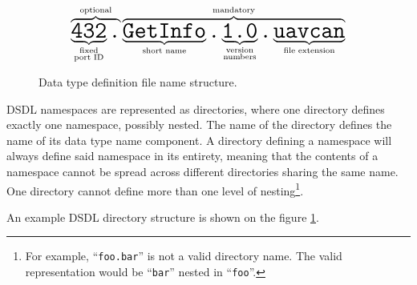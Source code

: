\begin{figure}[H]
    $$
    \overbrace{%
        \underbrace{\texttt{\huge{432}}}_{\substack{\text{fixed} \\ \text{port ID}}}%
        \texttt{\huge{.}}%
    }^{\text{optional}}%
    \overbrace{%
        \underbrace{\texttt{\huge{GetInfo}}}_{\substack{\text{short name}}}%
        \texttt{\huge{.}}%
        \underbrace{\texttt{\huge{1.0}}}_{\substack{\text{version} \\ \text{numbers}}}%
        \texttt{\huge{.}}%
        \underbrace{\texttt{\huge{uavcan}}}_{\text{file extension}}%
    }^{\text{mandatory}}
    $$
    \caption{Data type definition file name structure.\label{fig:dsdl_definition_file_name_structure}}
\end{figure}

DSDL namespaces are represented as directories, where one directory defines exactly one namespace, possibly nested.
The name of the directory defines the name of its data type name component.
A directory defining a namespace will always define said namespace in its entirety,
meaning that the contents of a namespace cannot be spread across different directories sharing the same name.
One directory cannot define more than one level of
nesting\footnote{For example, ``\texttt{foo.bar}'' is not a valid directory name.
The valid representation would be ``\texttt{bar}'' nested in ``\texttt{foo}''.}.

An example DSDL directory structure is shown on the figure \ref{fig:dsdl_definition_file_name_structure}.

